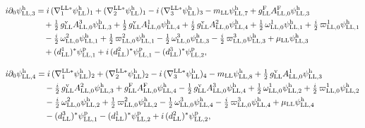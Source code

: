 \documentclass[
  10pt,
]{article}
\begin{document}
\[\begin{aligned}
i\partial_0\psi^{\rm h}_{{\rm LL},3}&=i\,(\nabla^{{\rm LL}*}_1\psi^{\rm h}_{\rm LL})_1+(\nabla^{{\rm LL}*}_2\psi^{\rm h}_{\rm LL})_1-i\,(\nabla^{{\rm LL}*}_3\psi^{\rm h}_{\rm LL})_3-m_{\rm LL}\psi^{\rm h}_{{\rm LL},7}+g^{\rm F}_{\rm LL}A^{\rm F}_{{\rm LL},0}\psi^{\rm h}_{{\rm LL},3}\\
&\quad +\tfrac{1}{2}\,g^{\rm v}_{\rm LL}A^{3}_{{\rm LL},0}\psi^{\rm h}_{{\rm LL},3}+\tfrac{1}{2}\,g^{\rm v}_{\rm LL}A^{1}_{{\rm LL},0}\psi^{\rm h}_{{\rm LL},4}+\tfrac{i}{2}\,g^{\rm v}_{\rm LL}A^{2}_{{\rm LL},0}\psi^{\rm h}_{{\rm LL},4}+\tfrac{1}{2}\,\omega^{1}_{{\rm LL},0}\psi^{\rm h}_{{\rm LL},1}+\tfrac{i}{2}\,\varpi^{1}_{{\rm LL},0}\psi^{\rm h}_{{\rm LL},1}\\
&\quad -\tfrac{i}{2}\,\omega^{2}_{{\rm LL},0}\psi^{\rm h}_{{\rm LL},1}+\tfrac{1}{2}\,\varpi^{2}_{{\rm LL},0}\psi^{\rm h}_{{\rm LL},1}-\tfrac{1}{2}\,\omega^{3}_{{\rm LL},0}\psi^{\rm h}_{{\rm LL},3}-\tfrac{i}{2}\,\varpi^{3}_{{\rm LL},0}\psi^{\rm h}_{{\rm LL},3}+\mu_{\rm LL}\psi^{\rm h}_{{\rm LL},3}\\
&\quad +(d^{1}_{\rm LL})^*\psi^{\rm p}_{{\rm LL},1}+i\,(d^{2}_{\rm LL})^*\psi^{\rm p}_{{\rm LL},1}-(d^{3}_{\rm LL})^*\psi^{\rm p}_{{\rm LL},2},
\end{aligned}\]

\[\begin{aligned}
i\partial_0\psi^{\rm h}_{{\rm LL},4}&=i\,(\nabla^{{\rm LL}*}_1\psi^{\rm h}_{\rm LL})_2+(\nabla^{{\rm LL}*}_2\psi^{\rm h}_{\rm LL})_2-i\,(\nabla^{{\rm LL}*}_3\psi^{\rm h}_{\rm LL})_4-m_{\rm LL}\psi^{\rm h}_{{\rm LL},8}+\tfrac{1}{2}\,g^{\rm v}_{\rm LL}A^{1}_{{\rm LL},0}\psi^{\rm h}_{{\rm LL},3}\\
&\quad -\tfrac{i}{2}\,g^{\rm v}_{\rm LL}A^{2}_{{\rm LL},0}\psi^{\rm h}_{{\rm LL},3}+g^{\rm F}_{\rm LL}A^{\rm F}_{{\rm LL},0}\psi^{\rm h}_{{\rm LL},4}-\tfrac{1}{2}\,g^{\rm v}_{\rm LL}A^{3}_{{\rm LL},0}\psi^{\rm h}_{{\rm LL},4}+\tfrac{1}{2}\,\omega^{1}_{{\rm LL},0}\psi^{\rm h}_{{\rm LL},2}+\tfrac{i}{2}\,\varpi^{1}_{{\rm LL},0}\psi^{\rm h}_{{\rm LL},2}\\
&\quad -\tfrac{i}{2}\,\omega^{2}_{{\rm LL},0}\psi^{\rm h}_{{\rm LL},2}+\tfrac{1}{2}\,\varpi^{2}_{{\rm LL},0}\psi^{\rm h}_{{\rm LL},2}-\tfrac{1}{2}\,\omega^{3}_{{\rm LL},0}\psi^{\rm h}_{{\rm LL},4}-\tfrac{i}{2}\,\varpi^{3}_{{\rm LL},0}\psi^{\rm h}_{{\rm LL},4}+\mu_{\rm LL}\psi^{\rm h}_{{\rm LL},4}\\
&\quad -(d^{3}_{\rm LL})^*\psi^{\rm p}_{{\rm LL},1}-(d^{1}_{\rm LL})^*\psi^{\rm p}_{{\rm LL},2}+i\,(d^{2}_{\rm LL})^*\psi^{\rm p}_{{\rm LL},2},
\end{aligned}\]
\end{document}

